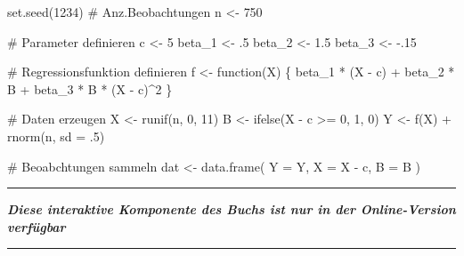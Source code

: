 \documentclass[
  a4paper,
  DIV=11,
  oneside]{scrreprt}
\newenvironment{Shaded}{\begin{snugshade}}{\end{snugshade}}
\newcommand{\AttributeTok}[1]{\textcolor[rgb]{0.40,0.45,0.13}{#1}}
\newcommand{\CommentTok}[1]{\textcolor[rgb]{0.37,0.37,0.37}{#1}}
\newcommand{\ControlFlowTok}[1]{\textcolor[rgb]{0.00,0.23,0.31}{#1}}
\newcommand{\DecValTok}[1]{\textcolor[rgb]{0.68,0.00,0.00}{#1}}
\newcommand{\FloatTok}[1]{\textcolor[rgb]{0.68,0.00,0.00}{#1}}
\newcommand{\FunctionTok}[1]{\textcolor[rgb]{0.28,0.35,0.67}{#1}}
\newcommand{\NormalTok}[1]{\textcolor[rgb]{0.00,0.23,0.31}{#1}}
\newcommand{\OtherTok}[1]{\textcolor[rgb]{0.00,0.23,0.31}{#1}}
\newcommand{\SpecialCharTok}[1]{\textcolor[rgb]{0.37,0.37,0.37}{#1}}
\begin{document}
\begin{Shaded}
\begin{Highlighting}[]
\FunctionTok{set.seed}\NormalTok{(}\DecValTok{1234}\NormalTok{)}
\CommentTok{\# Anz.Beobachtungen}
\NormalTok{n }\OtherTok{\textless{}{-}} \DecValTok{750}

\CommentTok{\# Parameter definieren}
\NormalTok{c }\OtherTok{\textless{}{-}} \DecValTok{5}
\NormalTok{beta\_1 }\OtherTok{\textless{}{-}}\NormalTok{ .}\DecValTok{5}
\NormalTok{beta\_2 }\OtherTok{\textless{}{-}} \FloatTok{1.5}
\NormalTok{beta\_3 }\OtherTok{\textless{}{-}} \SpecialCharTok{{-}}\NormalTok{.}\DecValTok{15}

\CommentTok{\# Regressionsfunktion definieren}
\NormalTok{f }\OtherTok{\textless{}{-}} \ControlFlowTok{function}\NormalTok{(X) \{}
\NormalTok{  beta\_1 }\SpecialCharTok{*}\NormalTok{ (X }\SpecialCharTok{{-}}\NormalTok{ c) }\SpecialCharTok{+}\NormalTok{ beta\_2 }\SpecialCharTok{*}\NormalTok{ B }\SpecialCharTok{+}\NormalTok{ beta\_3 }\SpecialCharTok{*}\NormalTok{ B }\SpecialCharTok{*}\NormalTok{ (X }\SpecialCharTok{{-}}\NormalTok{ c)}\SpecialCharTok{\^{}}\DecValTok{2}
\NormalTok{\}}

\CommentTok{\# Daten erzeugen}
\NormalTok{X }\OtherTok{\textless{}{-}} \FunctionTok{runif}\NormalTok{(n, }\DecValTok{0}\NormalTok{, }\DecValTok{11}\NormalTok{)}
\NormalTok{B }\OtherTok{\textless{}{-}} \FunctionTok{ifelse}\NormalTok{(X }\SpecialCharTok{{-}}\NormalTok{ c }\SpecialCharTok{\textgreater{}=} \DecValTok{0}\NormalTok{, }\DecValTok{1}\NormalTok{, }\DecValTok{0}\NormalTok{)}
\NormalTok{Y }\OtherTok{\textless{}{-}} \FunctionTok{f}\NormalTok{(X) }\SpecialCharTok{+} \FunctionTok{rnorm}\NormalTok{(n, }\AttributeTok{sd =}\NormalTok{ .}\DecValTok{5}\NormalTok{)}

\CommentTok{\# Beoabchtungen sammeln}
\NormalTok{dat }\OtherTok{\textless{}{-}} \FunctionTok{data.frame}\NormalTok{(}
  \AttributeTok{Y =}\NormalTok{ Y, }\AttributeTok{X =}\NormalTok{ X }\SpecialCharTok{{-}}\NormalTok{ c, }\AttributeTok{B =}\NormalTok{ B}
\NormalTok{)}
\end{Highlighting}
\end{Shaded}

\begin{center}\rule{0.5\linewidth}{0.5pt}\end{center}

\textbf{\emph{Diese interaktive Komponente des Buchs ist nur in der
Online-Version verfügbar}}

\begin{center}\rule{0.5\linewidth}{0.5pt}\end{center}
\end{document}
